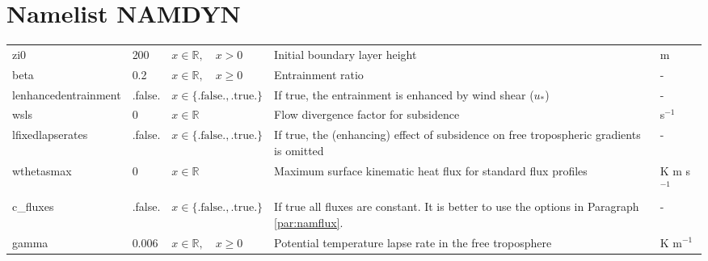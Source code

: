 \documentclass[twoside,11pt,fleqn,a4paper,english,openright]{report}
\begin{document}
\section{Namelist NAMDYN}\label{par:dynamics}
\begin{center}
  \tablelasttail{
        &&&&\\\hline
  }
\begin{supertabular}{|l|p{1.2cm}|p{3.4cm}|p{5cm}|l|}
zi0		&	200			& $x \in \mathbb{R}, \quad x > 0$		& Initial boundary layer height	&	m\\
beta	&	0.2			& $x \in \mathbb{R},\quad x \geq 0$	& Entrainment ratio								&	-\\
lenhancedentrainment	&	.false.			&	$x\in\{\text{.false.},\text{.true.}\}$		&	If true, the entrainment is enhanced by wind shear ($u_*$) 	& -\\
wsls	&	0				&	$x \in \mathbb{R}$								&	Flow divergence factor for subsidence	& s$^{-1}$\\
lfixedlapserates	&	.false.			&	$x\in\{\text{.false.},\text{.true.}\}$		&	If true, the (enhancing) effect of subsidence on free tropospheric gradients is omitted	& -\\
wthetasmax	& 0	&	$x \in \mathbb{R}$								&	Maximum surface kinematic heat flux for standard flux profiles	& K m s$^{-1}$\\
c\_fluxes	&	.false.	&	$x\in\{\text{.false.},\text{.true.}\}$	& If true all fluxes are constant. It is better to use the options in Paragraph \ref{par:namflux}.	& -\\
gamma	&	0.006		&	$x \in \mathbb{R}, \quad x \geq 0$		& Potential temperature lapse rate in the free troposphere	&	K m$^{-1}$\\

\end{supertabular}
\end{center}
\end{document}
